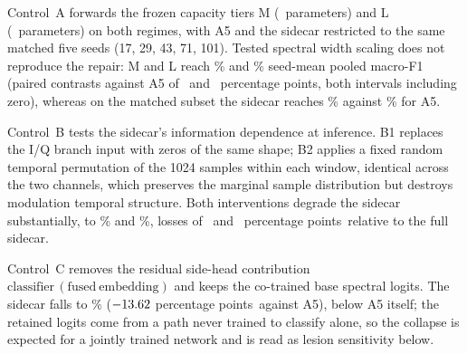 \documentclass[letterpaper,onecolumn,11pt,journal]{IEEEtran}
\newcommand{\pp}{percentage points}
\begin{document}
Control~A forwards the frozen capacity tiers M (\CapacityMParameters\
parameters) and L (\CapacityLParameters\ parameters) on both regimes, with
A5 and the sidecar restricted to the same matched five seeds
(17, 29, 43, 71, 101). Tested spectral width scaling does not reproduce the
repair: M and L reach \SevereControlLevelCapM\% and \SevereControlLevelCapL\%
seed-mean pooled macro-F1 (paired contrasts against A5 of
\SevereControlDiffCapM\ and \SevereControlDiffCapL\ \pp, both intervals
including zero), whereas on the matched subset the sidecar reaches
\SevereControlMatchedLevelSidecar\% against
\SevereControlMatchedLevelAFive\% for A5.

Control~B tests the sidecar's information dependence at inference. B1
replaces the I/Q branch input with zeros of the same shape; B2 applies a
fixed random temporal permutation of the 1024 samples within each window,
identical across the two channels, which preserves the marginal sample
distribution but destroys modulation temporal structure. Both interventions
degrade the sidecar substantially, to \SevereControlLevelIqZero\% and
\SevereControlLevelIqShuffle\%, losses of \SevereControlIqZeroLoss\ and
\SevereControlIqShuffleLoss\ \pp\ relative to the full sidecar.

Control~C removes the residual side-head contribution
$\mathrm{classifier}\,(\mathrm{fused\ embedding})$ and keeps the co-trained
base spectral logits. The sidecar falls to \SevereControlLevelNoSideHead\%
($-13.62$ \pp\ against A5), below A5 itself; the
retained logits come from a path never trained to classify alone, so the
collapse is expected for a jointly trained network and is read as lesion
sensitivity below.
\end{document}
